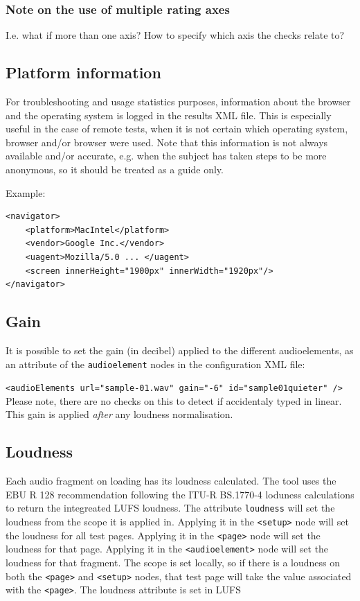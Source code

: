 \documentclass[11pt, oneside]{article}   	%
\begin{document}
		\subsubsection{Note on the use of multiple rating axes}
			I.e. what if more than one axis? How to specify which axis the checks relate to? %

	\subsection{Platform information}
		For troubleshooting and usage statistics purposes, information about the browser and the operating system is logged in the results XML file. This is especially useful in the case of remote tests, when it is not certain which operating system, browser and/or browser were used. Note that this information is not always available and/or accurate, e.g. when the subject has taken steps to be more anonymous, so it should be treated as a guide only.

		Example: 
		\begin{lstlisting}
<navigator>
	<platform>MacIntel</platform>
	<vendor>Google Inc.</vendor>
	<uagent>Mozilla/5.0 ... </uagent>
	<screen innerHeight="1900px" innerWidth="1920px"/>
</navigator>
		\end{lstlisting}

	\subsection{Gain}
		It is possible to set the gain (in decibel) applied to the different audioelements, as an attribute of the \texttt{audioelement} nodes in the configuration XML file: 

		\texttt{<audioElements url="sample-01.wav" gain="-6" id="sample01quieter" />}\\
		Please note, there are no checks on this to detect if accidentaly typed in linear. This gain is applied \emph{after} any loudness normalisation.

	\subsection{Loudness}
	\label{sec:loudness}
		Each audio fragment on loading has its loudness calculated. The tool uses the EBU R 128 recommendation following the ITU-R BS.1770-4 loduness calculations to return the integreated LUFS loudness. The attribute \texttt{loudness} will set the loudness from the scope it is applied in. Applying it in the \texttt{<setup>} node will set the loudness for all test pages. Applying it in the \texttt{<page>} node will set the loudness for that page. Applying it in the \texttt{<audioelement>} node will set the loudness for that fragment. The scope is set locally, so if there is a loudness on both the \texttt{<page>} and \texttt{<setup>} nodes, that test page will take the value associated with the \texttt{<page>}. The loudness attribute is set in LUFS
		
\end{document}
